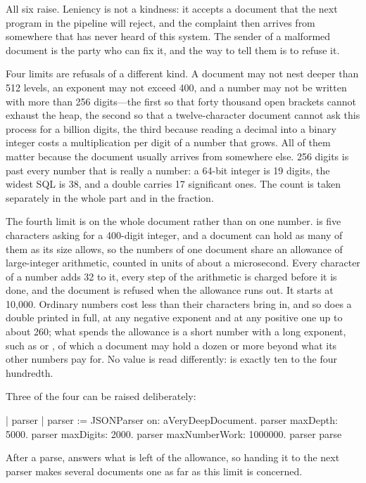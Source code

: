 All six raise. Leniency is not a kindness: it accepts a document that the
next program in the pipeline will reject, and the complaint then arrives from
somewhere that has never heard of this system. The sender of a malformed
document is the party who can fix it, and the way to tell them is to refuse
it.

Four limits are refusals of a different kind. A document may not nest
deeper than 512 levels, an exponent may not exceed 400, and a number may
not be written with more than 256 digits---the first so that forty thousand
open brackets cannot exhaust the heap, the second so that a twelve-character
document cannot ask this process for a billion digits, the third because
reading a decimal into a binary integer costs a multiplication per digit of
a number that grows. All of them matter because the document usually arrives
from somewhere else. 256 digits is past every number that is really a
number: a 64-bit integer is 19 digits, the widest SQL  is 38,
and a double carries 17 significant ones. The count is taken separately in
the whole part and in the fraction.

The fourth limit is on the whole document rather than on one number.
 is five characters asking for a 400-digit integer, and a
document can hold as many of them as its size allows, so the numbers of one
document share an allowance of large-integer arithmetic, counted in units of
about a microsecond. Every character of a number adds 32 to it, every step
of the arithmetic is charged before it is done, and the document is refused
when the allowance runs out. It starts at 10,000. Ordinary numbers cost less
than their characters bring in, and so does a double printed in full, at any
negative exponent and at any positive one up to about 260; what spends the
allowance is a short number with a long exponent, such as  or
, of which a document may hold a dozen or more beyond what its
other numbers pay for. No value is read differently:  is exactly
ten to the four hundredth.

Three of the four can be raised deliberately:

\begin{st}
| parser |
parser := JSONParser on: aVeryDeepDocument.
parser maxDepth: 5000.
parser maxDigits: 2000.
parser maxNumberWork: 1000000.
parser parse
\end{st}

\noindent After a parse,  answers what is left of the
allowance, so handing it to the next parser makes several documents one as
far as this limit is concerned.

